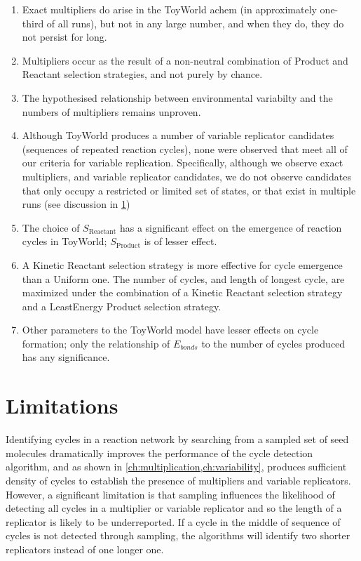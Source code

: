 \begin{enumerate}
\item Exact multipliers do arise in the ToyWorld \gls{achem} (in approximately one-third of all runs), but not in any large number, and when they do, they do not persist for long.
\item Multipliers occur as the result of a non-neutral combination of Product and Reactant selection strategies, and not purely by chance. 
\item The hypothesised relationship between environmental variabilty and the numbers of multipliers remains unproven. 
\item Although ToyWorld produces a number of variable replicator candidates (sequences of repeated reaction cycles), none were observed that meet all of our criteria for variable replication. Specifically, although we observe exact multipliers, and variable replicator candidates, we do not observe candidates that only occupy a restricted or limited set of states, or that exist in multiple runs (see discussion in \cref{sec:limitations})
\item The choice of $S_\mathrm{Reactant}$ has a significant effect on the emergence of reaction cycles in ToyWorld; $S_\mathrm{Product}$ is of lesser effect.
\item A Kinetic Reactant selection strategy is more effective for cycle emergence than a Uniform one. The number of cycles, and length of longest cycle, are maximized under the combination of a Kinetic Reactant selection strategy and a LeastEnergy Product selection strategy.
\item Other parameters to the ToyWorld model have lesser effects on cycle formation; only the relationship of $E_{bonds}$ to the number of cycles produced has any significance.
\end{enumerate}

\section{Limitations}\label{sec:limitations}

Identifying cycles in a reaction network by searching from a sampled set of seed molecules dramatically improves the performance of the cycle detection algorithm, and as shown in \cref{ch:multiplication,ch:variability}, produces sufficient density of cycles to establish the presence of multipliers and variable replicators. However, a significant limitation is that sampling influences the likelihood of detecting all cycles in a multiplier or variable replicator and so the length of a replicator is likely to be underreported. If a cycle in the middle of sequence of cycles is not detected through sampling, the algorithms will identify two shorter replicators instead of one longer one. 

